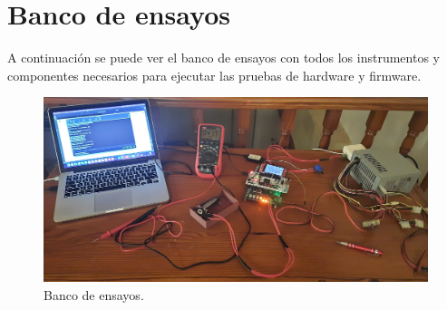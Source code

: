 
\chapter{Banco de ensayos} %

\label{AppendixB} %

A continuación se puede ver el banco de ensayos con todos los instrumentos y componentes necesarios para ejecutar las pruebas de hardware y firmware.

\begin{figure}[H]
\centering
\includegraphics[width=1\textwidth]{./Figures/setupEnsayos.jpg}
\caption{Banco de ensayos.}
\label{fig:setupEnsayos}
\end{figure}